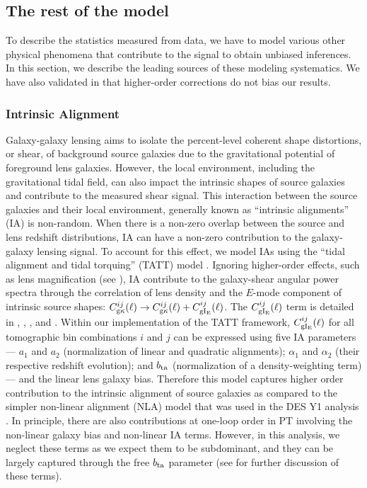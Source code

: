 \documentclass[aps, prd,twocolumn,superscriptaddress,nofootinbib,preprintnumbers]{revtex4-1}
\newcommand{\IR}[1]{{\color{red}[\textbf{Note for IR}: #1]}}
\begin{document}
\subsection{The rest of the model}
\label{sec:model_rest}

To describe the statistics measured from data, we have to model various other physical phenomena that contribute to the signal to obtain unbiased inferences. In this section, we describe the leading sources of these modeling systematics. We have also validated in \cite{y3-generalmethods} that higher-order corrections do not bias our results. 

\subsubsection{Intrinsic Alignment} 
Galaxy-galaxy lensing aims to isolate the percent-level coherent shape distortions, or shear, of background source galaxies due to the gravitational potential of foreground lens galaxies. However, the local environment, including the gravitational tidal field, can also impact the intrinsic shapes of source galaxies and contribute to the measured shear signal. This interaction between the source galaxies and their local environment, generally known as ``intrinsic alignments'' (IA) is non-random. When there is a non-zero overlap between the source and lens redshift distributions, IA can have a non-zero contribution to the galaxy-galaxy lensing signal. To account for this effect, we model IAs using the ``tidal alignment and tidal torquing'' (TATT) model \citep{Blazek_2019}. Ignoring higher-order effects, such as lens magnification (see \citealp{y3-gglensing,y3-2x2ptmagnification}), IA contribute to the galaxy-shear angular power spectra through the correlation of lens density and the $E$-mode component of intrinsic source shapes: $C^{ij}_{\rm g\kappa}(\ell) \to C^{ij}_{\rm g\kappa}(\ell) + C^{ij}_{\rm gI_{\rm E}}(\ell)$. The $C^{ij}_{\rm gI_{\rm E}}(\ell)$ term is detailed in \cite{y3-generalmethods}, \cite{y3-cosmicshear2}, \cite{y3-gglensing}, and \citet{Blazek_2019}. Within our implementation of the TATT framework, $C^{ij}_{\rm gI_{\rm E}}(\ell)$ for all tomographic bin combinations $i$ and $j$ can be expressed using five IA parameters --- $a_1$ and $a_2$ (normalization of linear and quadratic alignments); $\alpha_1$ and $\alpha_2$ (their respective redshift evolution); and $b_{\rm ta}$ (normalization of a density-weighting term) --- and the linear lens galaxy bias. Therefore this model captures higher order contribution to the intrinsic alignment of source galaxies as compared to the simpler non-linear alignment (NLA) model that was used in the DES Y1 analysis \citep{Krause2017,Abbott_2018}. In principle, there are also contributions at one-loop order in PT involving the non-linear galaxy bias and non-linear IA terms. However, in this analysis, we neglect these terms as we expect them to be subdominant, and they can be largely captured through the free $b_{\rm ta}$ parameter (see \citealp{Blazek_2015} for further discussion of these terms). 
\end{document}
